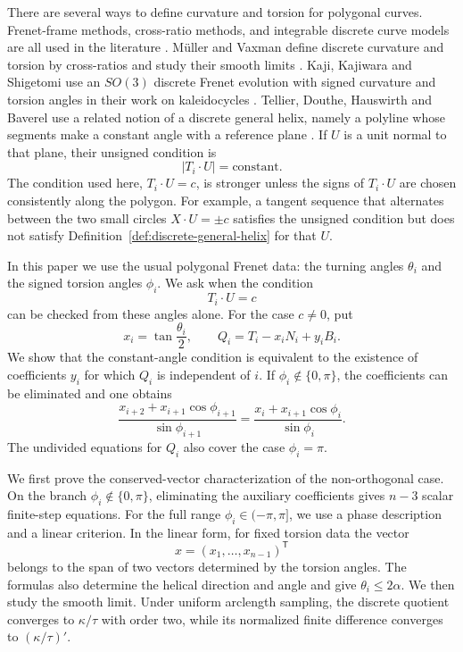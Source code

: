 \documentclass[10pt,a4paper]{amsart}
\theoremstyle{definition}
\theoremstyle{remark}
\numberwithin{equation}{section}
\begin{document}
There are several ways to define curvature and torsion for polygonal curves. Frenet-frame methods, cross-ratio methods, and integrable discrete curve models are all used in the literature \cite{Carroll2014,MullerVaxman2021,Hoffmann2026,Kaji2026}. M\"uller and Vaxman define discrete curvature and torsion by cross-ratios and study their smooth limits \cite{MullerVaxman2021}. Kaji, Kajiwara and Shigetomi use an $SO(3)$ discrete Frenet evolution with signed curvature and torsion angles in their work on kaleidocycles \cite{Kaji2026}. Tellier, Douthe, Hauswirth and Baverel use a related notion of a discrete general helix, namely a polyline whose segments make a constant angle with a reference plane \cite{Tellier2019}. If $U$ is a unit normal to that plane, their unsigned condition is
\[
|T_i\cdot U|=\mathrm{constant}.
\]
The condition used here, $T_i\cdot U=c$, is stronger unless the signs of $T_i\cdot U$ are chosen consistently along the polygon. For example, a tangent sequence that alternates between the two small circles $X\cdot U=\pm c$ satisfies the unsigned condition but does not satisfy Definition~\ref{def:discrete-general-helix} for that $U$.

In this paper we use the usual polygonal Frenet data: the turning angles $\theta_i$ and the signed torsion angles $\phi_i$. We ask when the condition
\[
T_i\cdot U=c
\]
can be checked from these angles alone. For the case $c\ne0$, put
\[
x_i=\tan\frac{\theta_i}{2},
\qquad
Q_i=T_i-x_iN_i+y_iB_i.
\]
We show that the constant-angle condition is equivalent to the existence of coefficients $y_i$ for which $Q_i$ is independent of $i$. If $\phi_i\notin\{0,\pi\}$, the coefficients can be eliminated and one obtains
\[
\frac{x_{i+2}+x_{i+1}\cos\phi_{i+1}}{\sin\phi_{i+1}}
=
\frac{x_i+x_{i+1}\cos\phi_i}{\sin\phi_i}.
\]
The undivided equations for $Q_i$ also cover the case $\phi_i=\pi$.

We first prove the conserved-vector characterization of the non-orthogonal case. On the branch $\phi_i\notin\{0,\pi\}$, eliminating the auxiliary coefficients gives $n-3$ scalar finite-step equations. For the full range $\phi_i\in(-\pi,\pi]$, we use a phase description and a linear criterion. In the linear form, for fixed torsion data the vector
\[
x=(x_1,\ldots,x_{n-1})^{\mathsf T}
\]
belongs to the span of two vectors determined by the torsion angles. The formulas also determine the helical direction and angle and give $\theta_i\le2\alpha$. We then study the smooth limit. Under uniform arclength sampling, the discrete quotient converges to $\kappa/\tau$ with order two, while its normalized finite difference converges to $(\kappa/\tau)'$.
\end{document}
